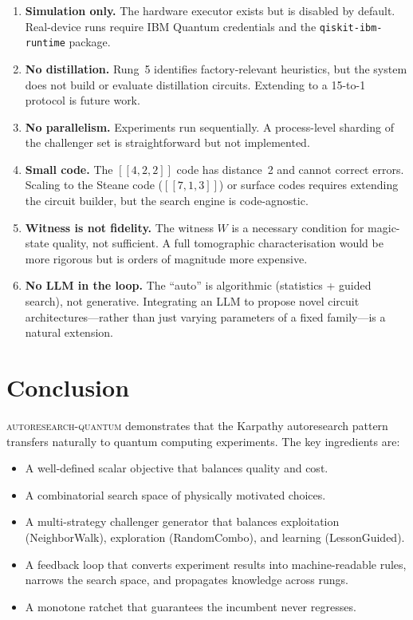 \documentclass[11pt,a4paper]{article}
\newcommand{\code}[1]{\texttt{#1}}
\begin{document}
\begin{enumerate}
  \item \textbf{Simulation only.} The hardware executor exists but is disabled
    by default. Real-device runs require IBM Quantum credentials and the
    \code{qiskit-ibm-runtime} package.

  \item \textbf{No distillation.} Rung~5 identifies factory-relevant
    heuristics, but the system does not build or evaluate distillation
    circuits. Extending to a 15-to-1 protocol is future work.

  \item \textbf{No parallelism.} Experiments run sequentially. A
    process-level sharding of the challenger set is straightforward but not
    implemented.

  \item \textbf{Small code.} The $[\![4,2,2]\!]$ code has distance~2 and
    cannot correct errors. Scaling to the Steane code ($[\![7,1,3]\!]$) or
    surface codes requires extending the circuit builder, but the search
    engine is code-agnostic.

  \item \textbf{Witness is not fidelity.} The witness $W$ is a necessary
    condition for magic-state quality, not sufficient. A full tomographic
    characterisation would be more rigorous but is orders of magnitude more
    expensive.

  \item \textbf{No LLM in the loop.} The ``auto'' is algorithmic (statistics
    + guided search), not generative. Integrating an LLM to propose novel
    circuit architectures---rather than just varying parameters of a fixed
    family---is a natural extension.
\end{enumerate}

\section{Conclusion}
\label{sec:conclusion}

\textsc{autoresearch-quantum} demonstrates that the Karpathy autoresearch
pattern transfers naturally to quantum computing experiments. The key
ingredients are:

\begin{itemize}
  \item A well-defined scalar objective that balances quality and cost.
  \item A combinatorial search space of physically motivated choices.
  \item A multi-strategy challenger generator that balances exploitation
    (NeighborWalk), exploration (RandomCombo), and learning (LessonGuided).
  \item A feedback loop that converts experiment results into machine-readable
    rules, narrows the search space, and propagates knowledge across rungs.
  \item A monotone ratchet that guarantees the incumbent never regresses.
\end{itemize}
\end{document}
